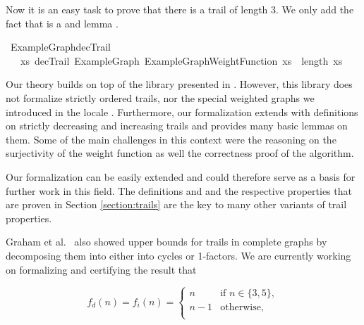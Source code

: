 \begin{isabellebody}
\isadelimproof
%
\endisadelimproof
%
\isatagproof
%
\endisatagproof
{\isafoldproof}%
%
\isadelimproof
%
\endisadelimproof
%
\begin{isamarkuptext}%
Now it is an easy task to prove that there is a trail of length 3. We only add the fact that
 is a  and lemma .%
\end{isamarkuptext}\isamarkuptrue%
\isamarkupfalse%
\ ExampleGraph{\isacharunderscore}decTrail{\isacharcolon}\isanewline
\ \ {\isachardoublequoteopen}{\isasymexists}\ xs{\isachardot}\ decTrail\ ExampleGraph\ ExampleGraphWeightFunction\ xs\ {\isasymand}\ length\ xs\ {\isacharequal}\ {}{\isachardoublequoteclose}%
\isadelimproof
%
\endisadelimproof
%
\isatagproof
%
\endisatagproof
{\isafoldproof}%
%
\isadelimproof
%
\endisadelimproof
%
\isadelimdocument
%
\endisadelimdocument
%
\isatagdocument
%
\isamarkuptrue%
%
\endisatagdocument
{\isafolddocument}%
%
\isadelimdocument
%
\endisadelimdocument
%
\begin{isamarkuptext}%
Our theory  builds on top of the  library presented in \cite{Graph_Theory-AFP}.
However, this library does not formalize strictly ordered trails, nor the special weighted graphs we 
introduced in the locale . 
Furthermore, our formalization extends \cite{Graph_Theory-AFP} with definitions on strictly decreasing and 
increasing trails and provides many basic lemmas on them. Some of the main challenges in this context 
were the reasoning on the surjectivity of the weight function as well the correctness proof of the algorithm.

Our formalization can be easily extended and could therefore serve as a basis for further work in this field.
The definitions  and  and the respective properties that are proven in 
Section \ref{section:trails} are the key to many other variants of trail properties. 

Graham et al.~\cite{graham1973increasing} also showed upper bounds for trails in complete graphs by decomposing
them into either into cycles or 1-factors. We are currently working on formalizing and certifying the result 
that 

$$
f_d(n)= f_i(n) = 
\begin{cases}
n &  \text{if } n \in \{3,5\},\\
n-1 & \text{otherwise},\\
\end{cases}
$$


\end{isamarkuptext}
\end{isabellebody}
